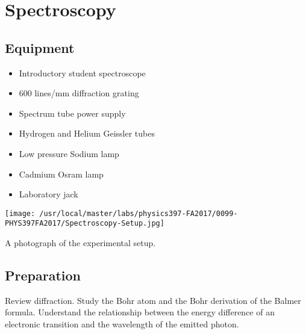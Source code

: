 

%
%


\setcounter{chapter}{7}
\setcounter{equation}{0}
\setcounter{table}{0}
\setcounter{figure}{0}
\chapter{Spectroscopy}

\section{Equipment}

\begin{minipage}[t]{0.6\textwidth}
\begin{itemize}[noitemsep]
\item Introductory student spectroscope
\item 600 lines/mm diffraction grating
\item Spectrum tube power supply
\item Hydrogen and Helium Geissler tubes 
\end{itemize}
\end{minipage}
\begin{minipage}[t]{0.4\textwidth}
\begin{itemize}[noitemsep]
\item Low pressure Sodium lamp
\item Cadmium Osram lamp
\item Laboratory jack
\end{itemize}
\end{minipage}

\begin{marginfigure}[+1in]
\texttt{[image: /usr/local/master/labs/physics397-FA2017/0099-PHYS397FA2017/Spectroscopy-Setup.jpg]}
\caption{A photograph of the experimental setup.}
\label{fig:SPsetup}
\end{marginfigure}

\section{Preparation}
Review diffraction. Study the Bohr atom and the Bohr derivation of the Balmer formula. Understand the relationship between the energy difference of an electronic transition and the wavelength of the emitted photon.

